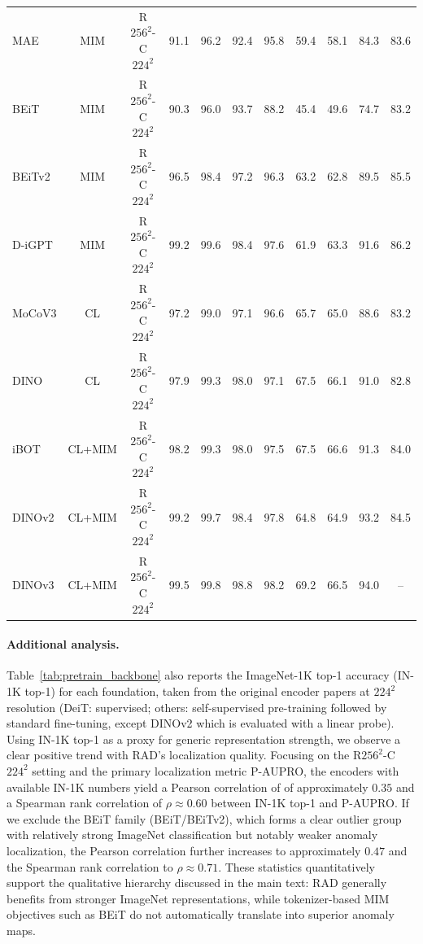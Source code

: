 \documentclass{article}
\theoremstyle{plain}
\theoremstyle{definition}
\theoremstyle{remark}
\begin{document}
\begin{table}[t]
{\begin{tabular}{lcccccccccc}
MAE    & MIM        & R$256^2$-C$224^2$ & 91.1 & 96.2 & 92.4 & 95.8 & 59.4 & 58.1 & 84.3 & 83.6 \\
BEiT   & MIM        & R$256^2$-C$224^2$ & 90.3 & 96.0 & 93.7 & 88.2 & 45.4 & 49.6 & 74.7 & 83.2 \\
BEiTv2 & MIM        & R$256^2$-C$224^2$ & 96.5 & 98.4 & 97.2 & 96.3 & 63.2 & 62.8 & 89.5 & 85.5 \\
D-iGPT & MIM        & R$256^2$-C$224^2$ & 99.2 & 99.6 & 98.4 & 97.6 & 61.9 & 63.3 & 91.6 & 86.2 \\
MoCoV3 & CL         & R$256^2$-C$224^2$ & 97.2 & 99.0 & 97.1 & 96.6 & 65.7 & 65.0 & 88.6 & 83.2 \\
DINO   & CL         & R$256^2$-C$224^2$ & 97.9 & 99.3 & 98.0 & 97.1 & 67.5 & 66.1 & 91.0 & 82.8 \\
iBOT   & CL+MIM     & R$256^2$-C$224^2$ & 98.2 & 99.3 & 98.0 & 97.5 & 67.5 & 66.6 & 91.3 & 84.0 \\
DINOv2 & CL+MIM     & R$256^2$-C$224^2$ & 99.2 & 99.7 & 98.4 & 97.8 & 64.8 & 64.9 & 93.2 & 84.5 \\
\rowcolor{cyan!10}
DINOv3 & CL+MIM     & R$256^2$-C$224^2$ & 99.5 & 99.8 & 98.8 & 98.2 & 69.2 & 66.5 & 94.0 & -- \\
\bottomrule
\end{tabular}
}
\end{table}

\paragraph{Additional analysis.}
Table~\ref{tab:pretrain_backbone} also reports the ImageNet-1K top-1 accuracy (IN-1K top-1) for each foundation, taken from the original encoder papers at $224^2$ resolution (DeiT: supervised; others: self-supervised pre-training followed by standard fine-tuning, except DINOv2 which is evaluated with a linear probe). Using IN-1K top-1 as a proxy for generic representation strength, we observe a clear positive trend with RAD's localization quality. Focusing on the R$256^2$-C$224^2$ setting and the primary localization metric P-AUPRO, the encoders with available IN-1K numbers yield a Pearson correlation of of approximately $0.35$ and a Spearman rank correlation of $\rho \approx 0.60$ between IN-1K top-1 and P-AUPRO. If we exclude the BEiT family (BEiT/BEiTv2), which forms a clear outlier group with relatively strong ImageNet classification but notably weaker anomaly localization, the Pearson correlation further increases to approximately $0.47$ and the Spearman rank correlation to $\rho \approx 0.71$. These statistics quantitatively support the qualitative hierarchy discussed in the main text: RAD generally benefits from stronger ImageNet representations, while tokenizer-based MIM objectives such as BEiT do not automatically translate into superior anomaly maps.
\end{document}
